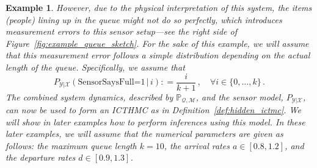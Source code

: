 \documentclass[3p]{elsarticle}
\newtheorem{example}{Example}[section]
\newcommand{\states}{\mathcal{X}}
\newcommand{\observs}{\mathcal{Y}}
\newcommand{\rateset}{\mathcal{Q}}
\newcommand{\coloneqq}{:\!=}
\begin{document}
\begin{example}
However, due to the physical interpretation of this system, the items (people) lining up in the queue might not do so perfectly, which introduces measurement errors to this sensor setup---see the right side of Figure~\ref{fig:example_queue_sketch}. For the sake of this example, we will assume that this measurement error follows a simple distribution depending on the actual length of the queue. Specifically, we assume that
\begin{equation*}
P_{\observs\vert\states}(\text{SensorSaysFull=1}\,\vert\,i) \coloneqq \frac{i}{k+1}\,,\quad\forall i \in \{0,\ldots,k\}\,.
\end{equation*}
The combined system dynamics, described by $\mathbb{P}_{\rateset,\mathcal{M}}$, and the sensor model, $P_{\observs\vert\states}$, can now be used to form an ICTHMC as in Definition~\ref{def:hidden_ictmc}. We will show in later examples how to perform inferences using this model. In these later examples, we will assume that the numerical parameters are given as follows: the maximum queue length $k=10$, the arrival rates $a\in[0.8,1.2]$, and the departure rates $d\in[0.9,1.3]$.


\end{example}
\end{document}
